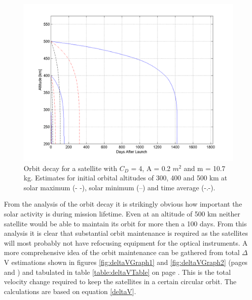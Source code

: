 \begin{figure}[h!]
\centering
\includegraphics[width=0.95\textheight, angle=90]{chapters/img/orbitDecayRecieverMin.png}
\caption{Orbit decay for a satellite with $C_D$ = 4, A = 0.2 $m^2$ and m = 10.7 kg. Estimates for initial orbital altitudes of 300, 400 and 500 km at solar maximum (- -), solar minimum (--) and time average (-.-).}
\label{fig:decayReceiver}
\end{figure}

From the analysis of the orbit decay it is strikingly obvious how important the solar activity is during mission lifetime. Even at an altitude of 500 km neither satellite would be able to maintain its orbit for more then a 100 days. From this analysis it is clear that substantial orbit maintenance is required as the satellites will most probably not have refocusing equipment for the optical instruments. A more comprehensive idea of the orbit maintenance can be gathered from total $\Delta$V estimations shown in figures \ref{fig:deltaVGraph1} and \ref{fig:deltaVGraph2} (pages \pageref{fig:deltaVGraph1} and \pageref{fig:deltaVGraph2}) and tabulated in table \ref{table:deltaVTable} on page \pageref{table:deltaVTable}. This is the total velocity change required to keep the satellites in a certain circular orbit. The calculations are based on equation \ref{deltaV}.

